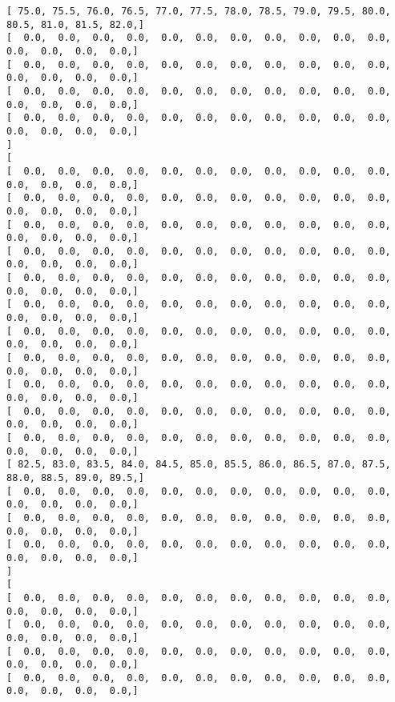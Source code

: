 \documentclass[11pt]{article}
\begin{document}
\begin{Verbatim}[commandchars=\\\{\}]
[  75.0,  75.5,  76.0,  76.5,  77.0,  77.5,  78.0,  78.5,  79.0,  79.5,  80.0,  80.5,  81.0,  81.5,  82.0, ]
[   0.0,   0.0,   0.0,   0.0,   0.0,   0.0,   0.0,   0.0,   0.0,   0.0,   0.0,   0.0,   0.0,   0.0,   0.0, ]
[   0.0,   0.0,   0.0,   0.0,   0.0,   0.0,   0.0,   0.0,   0.0,   0.0,   0.0,   0.0,   0.0,   0.0,   0.0, ]
[   0.0,   0.0,   0.0,   0.0,   0.0,   0.0,   0.0,   0.0,   0.0,   0.0,   0.0,   0.0,   0.0,   0.0,   0.0, ]
[   0.0,   0.0,   0.0,   0.0,   0.0,   0.0,   0.0,   0.0,   0.0,   0.0,   0.0,   0.0,   0.0,   0.0,   0.0, ]
]
[
[   0.0,   0.0,   0.0,   0.0,   0.0,   0.0,   0.0,   0.0,   0.0,   0.0,   0.0,   0.0,   0.0,   0.0,   0.0, ]
[   0.0,   0.0,   0.0,   0.0,   0.0,   0.0,   0.0,   0.0,   0.0,   0.0,   0.0,   0.0,   0.0,   0.0,   0.0, ]
[   0.0,   0.0,   0.0,   0.0,   0.0,   0.0,   0.0,   0.0,   0.0,   0.0,   0.0,   0.0,   0.0,   0.0,   0.0, ]
[   0.0,   0.0,   0.0,   0.0,   0.0,   0.0,   0.0,   0.0,   0.0,   0.0,   0.0,   0.0,   0.0,   0.0,   0.0, ]
[   0.0,   0.0,   0.0,   0.0,   0.0,   0.0,   0.0,   0.0,   0.0,   0.0,   0.0,   0.0,   0.0,   0.0,   0.0, ]
[   0.0,   0.0,   0.0,   0.0,   0.0,   0.0,   0.0,   0.0,   0.0,   0.0,   0.0,   0.0,   0.0,   0.0,   0.0, ]
[   0.0,   0.0,   0.0,   0.0,   0.0,   0.0,   0.0,   0.0,   0.0,   0.0,   0.0,   0.0,   0.0,   0.0,   0.0, ]
[   0.0,   0.0,   0.0,   0.0,   0.0,   0.0,   0.0,   0.0,   0.0,   0.0,   0.0,   0.0,   0.0,   0.0,   0.0, ]
[   0.0,   0.0,   0.0,   0.0,   0.0,   0.0,   0.0,   0.0,   0.0,   0.0,   0.0,   0.0,   0.0,   0.0,   0.0, ]
[   0.0,   0.0,   0.0,   0.0,   0.0,   0.0,   0.0,   0.0,   0.0,   0.0,   0.0,   0.0,   0.0,   0.0,   0.0, ]
[   0.0,   0.0,   0.0,   0.0,   0.0,   0.0,   0.0,   0.0,   0.0,   0.0,   0.0,   0.0,   0.0,   0.0,   0.0, ]
[  82.5,  83.0,  83.5,  84.0,  84.5,  85.0,  85.5,  86.0,  86.5,  87.0,  87.5,  88.0,  88.5,  89.0,  89.5, ]
[   0.0,   0.0,   0.0,   0.0,   0.0,   0.0,   0.0,   0.0,   0.0,   0.0,   0.0,   0.0,   0.0,   0.0,   0.0, ]
[   0.0,   0.0,   0.0,   0.0,   0.0,   0.0,   0.0,   0.0,   0.0,   0.0,   0.0,   0.0,   0.0,   0.0,   0.0, ]
[   0.0,   0.0,   0.0,   0.0,   0.0,   0.0,   0.0,   0.0,   0.0,   0.0,   0.0,   0.0,   0.0,   0.0,   0.0, ]
]
[
[   0.0,   0.0,   0.0,   0.0,   0.0,   0.0,   0.0,   0.0,   0.0,   0.0,   0.0,   0.0,   0.0,   0.0,   0.0, ]
[   0.0,   0.0,   0.0,   0.0,   0.0,   0.0,   0.0,   0.0,   0.0,   0.0,   0.0,   0.0,   0.0,   0.0,   0.0, ]
[   0.0,   0.0,   0.0,   0.0,   0.0,   0.0,   0.0,   0.0,   0.0,   0.0,   0.0,   0.0,   0.0,   0.0,   0.0, ]
[   0.0,   0.0,   0.0,   0.0,   0.0,   0.0,   0.0,   0.0,   0.0,   0.0,   0.0,   0.0,   0.0,   0.0,   0.0, ]

\end{Verbatim}
\end{document}
